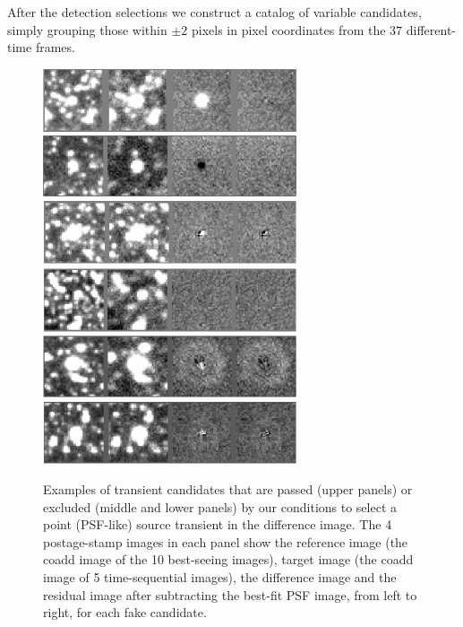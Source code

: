 \documentclass[iop, apj]{emulateapj}
\newcommand{\?}{\stackrel{?}{=}}
\begin{document}
After the detection selections we construct a catalog of variable candidates, 
simply grouping those within ${\pm 2}$ pixels in pixel coordinates from the $37$ different-time frames.  %


\begin{figure}[t]
\centering
\includegraphics[width=7.5cm,clip]{pic/flare_ex.pdf}
\includegraphics[width=7.5cm,clip]{pic/binary_ex.pdf}
\includegraphics[width=7.5cm,clip]{pic/minsizeratio.pdf}
\includegraphics[width=7.5cm,clip]{pic/maxsizeratio.pdf}
\includegraphics[width=7.5cm,clip]{pic/limaxisratio.pdf}
\includegraphics[width=7.5cm,clip]{pic/maxresidual.pdf}
\caption{\small{
Examples of transient candidates that are passed (upper panels) or excluded (middle and lower panels) by our conditions to select a point (PSF-like) source transient in the difference image. The 4 postage-stamp images in each panel show the reference image (the coadd image of the 10 best-seeing images), target image (the coadd image of 5 time-sequential images), the difference image and the residual image after subtracting the best-fit PSF image, from left to right, for each fake candidate. 
}}
\end{figure}
\end{document}
